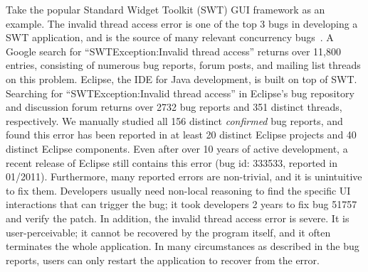 Take the popular Standard Widget Toolkit (SWT) GUI framework as an example. 
The invalid thread access error is one of the top 3 bugs in developing a SWT application, and is
the source of many relevant concurrency bugs~\cite{top3bugs}.
A Google search for ``SWTException:Invalid thread access''  returns over 11,800 entries,
consisting of numerous bug reports, forum posts, and mailing list threads on
this problem. Eclipse, the IDE for Java development, is built on top of SWT.
Searching for ``SWTException:Invalid thread access'' in Eclipse's bug repository
and discussion forum returns over 2732 bug reports and 351 distinct threads, respectively. 
We manually studied all 156 distinct \textit{confirmed} bug reports, and 
found this error has been reported in at least 20 distinct Eclipse projects
and 40 distinct Eclipse components. Even after over 10 years of active development,
a recent release of Eclipse still contains this error (bug id: 333533, reported in 01/2011).
 Furthermore, many reported  errors are non-trivial, and it is unintuitive
to fix them. Developers usually need non-local reasoning to find the specific
UI interactions that can trigger the bug;  it took developers 2 years
to fix bug 51757 and verify the patch. In addition, the invalid thread access error
is severe. It is user-perceivable; it cannot be recovered by the program itself,
and it often terminates the whole application. In many circumstances as described in the bug reports,
users can only restart the application to recover from the error.

